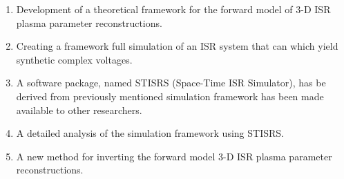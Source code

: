 \begin{enumerate}
\item Development of a theoretical framework for the forward model of 3-D ISR plasma parameter reconstructions.
\item Creating a framework full simulation of an ISR system that can which yield synthetic complex voltages.
\item A software package, named STISRS (Space-Time ISR Simulator), has be derived from previously mentioned simulation framework has been made available to other researchers.
\item A detailed analysis of the simulation framework using STISRS.
\item A new method for inverting the forward model 3-D ISR plasma parameter reconstructions.
\end{enumerate}